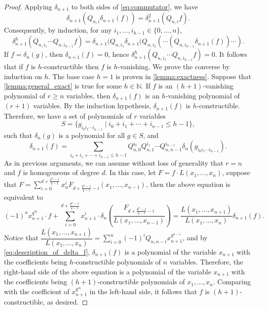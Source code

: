 \documentclass[12pt,a4paper]{report}
\theoremstyle{definition}
\theoremstyle{remark}
\theoremstyle{definition}
\begin{document}
\begin{proof}
    Applying $\delta_{n+1}$ to both sides of \eqref{eq:commutator}, we have
    \begin{equation*}
        \delta_{n+1}(Q_{n, i}\delta_{n+1}(f)) = \delta_{n+1}^2(Q_{n, i}f).
    \end{equation*}
    Consequently, by induction, for any $i_1, \ldots, i_{h-1}\in \{0, \ldots, n\}$, 
    \begin{equation*}
        \delta_{n+1}^h(Q_{n, i_1}\cdots Q_{n, i_{h-1}} f) = \delta_{n+1}(Q_{n, i_1}\delta_{n+1}(Q_{n, i_2}(\cdots(Q_{n, i_{h-1}}\delta_{n+1}(f))\cdots ). 
    \end{equation*}
    If $f = \delta_n(g)$, then $\delta_{n+1}(f) = 0$, hence $\delta_{n+1}^h(Q_{n, i_1}\cdots Q_{n, i_{h-1}} f) = 0$. It follows that if $f$ is $h$-constructible then $f$ is $h$-vanishing.\smallbreak
    We prove the converse by induction on $h$. The base case $h=1$ is proven in \cref{lemma:exactness}. Suppose that \cref{lemma:general_exact} is true for some $h \in \mathbb{N}$. If $f$ is an $(h+1)$-vanishing polynomial of $r\geq n$ variables, then $\delta_{n+1}(f)$ is an $h$-vanishing polynomial of $(r+1)$ variables. By the induction hypothesis, $\delta_{n+1}(f)$ is $h$-constructible. Therefore, we have a set of polynomials of $r$ variables 
\begin{equation*}
S = \{g_{i_{0}i_{1}\cdots i_{n-1}} \mid i_0 + i_1 + \cdots + i_{n-1} \leq h-1\},    
\end{equation*}
such that $\delta_n(g)$ is a polynomial for all $g\in S$, and 
\begin{equation}\label{eq:description_of_delta_f}
    \delta_{n+1}(f) = \sum\limits_{i_0 + i_1 + \cdots + i_{n-1} \leq h-1}Q_{n,0}^{i_0}Q_{n,1}^{i_1}\cdots Q_{n, n-1}^{i_{n-1}}\delta_n(g_{i_{0}i_{1}\cdots i_{n-1}}).
\end{equation}
As in previous arguments, we can assume without loss of generality that $r = n$ and $f$ is homogeneous of degree $d$. In this case, let $F = f\cdot L(x_1, \ldots, x_n)$, suppose that $F = \sum\limits_{i=0}^{d+\frac{q^n-1}{q-1}}x_n^{i}F_{d+\frac{q^n-1}{q-1}-i}(x_1, \ldots, x_{n-1})$, then the above equation is equivalent to
\begin{equation*}
    (-1)^{n}x_{n+1}^{q^m}\cdot f + \sum\limits_{i=0}^{d+\frac{q^n-1}{q-1}}x_{n+1}^i\cdot  \delta_n\left(\dfrac{F_{d+\frac{q^n-1}{q-1}-i}}{L(x_1, \ldots, x_{n-1})}\right) = \dfrac{L(x_1, \ldots, x_{n+1})}{L(x_1, \ldots, x_n)}\delta_{n+1}(f).
\end{equation*}
Notice that $\dfrac{L(x_1, \ldots, x_{n+1})}{L(x_1, \ldots, x_n)} = \sum\limits_{i=0}^{n}(-1)^i Q_{n, n-i}x_{n+1}^{q^{n-i}}$, and by \eqref{eq:description_of_delta_f}, $\delta_{n+1}(f)$ is a polynomial of the variable $x_{n+1}$ with the coefficients being $h$-constructible polynomials of $n$ variables. Therefore, the right-hand side of the above equation is a polynomial of the variable $x_{n+1}$ with the coefficients being $(h+1)$-constructible polynomials of $x_1, \ldots, x_n$. Comparing with the coefficient of $x_{n+1}^{q^m}$ in the left-hand side, it follows that $f$ is $(h+1)$-constructible, as desired.
\end{proof}
\end{document}
